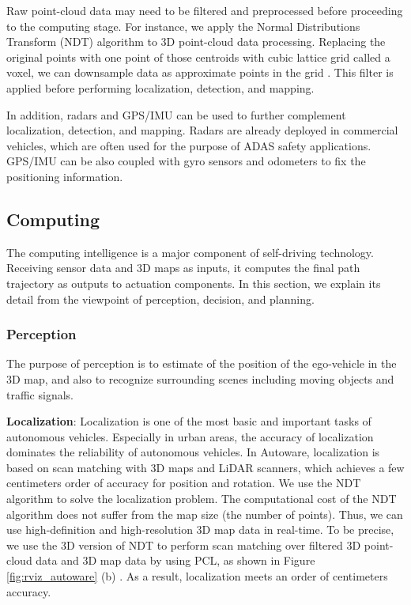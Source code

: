 Raw point-cloud data may need to be filtered and preprocessed before
proceeding to the computing stage.
For instance, we apply the Normal Distributions Transform (NDT)
algorithm \cite{biber2003normal} to 3D point-cloud data processing. 
Replacing the original points with one point of those centroids with
cubic lattice grid called a voxel, we can downsample data as approximate
points in the grid \cite{magnusson2009three}. 
This filter is applied before performing localization, detection, and
mapping.

In addition, radars and GPS/IMU can be used to further complement
localization, detection, and mapping.
Radars are already deployed in commercial vehicles, which are often used
for the purpose of ADAS safety applications.
GPS/IMU can be also coupled with gyro sensors and odometers to fix the
positioning information.

\subsection{Computing}
\label{sec:computing}

The computing intelligence is a major component of self-driving
technology.
Receiving sensor data and 3D maps as inputs, it computes the final path
trajectory as outputs to actuation components.
In this section, we explain its detail from the viewpoint of perception,
decision, and planning. 

\subsubsection{Perception}
\label{sec:perception}
The purpose of perception is to estimate of the position of the
ego-vehicle in the 3D map, and also to recognize surrounding scenes
including moving objects and traffic signals.

\textbf{Localization}:
Localization is one of the most basic and important tasks of autonomous
vehicles.
Especially in urban areas, the accuracy of localization dominates the
reliability of autonomous vehicles.
In Autoware, localization is based on scan matching with 3D maps and
LiDAR scanners, which achieves a few centimeters order of accuracy for
position and rotation. 
We use the NDT \cite{biber2003normal} algorithm to solve the
localization problem.
The computational cost of the NDT algorithm does not suffer from the map
size (the number of points).
Thus, we can use high-definition and high-resolution 3D map data in
real-time.
To be precise, we use the 3D version of NDT to perform scan matching
over filtered 3D point-cloud data and 3D map data by using PCL, as shown
in Figure \ref{fig:rviz_autoware} (b) \cite{magnusson2009three}.
As a result, localization meets an order of centimeters accuracy.

